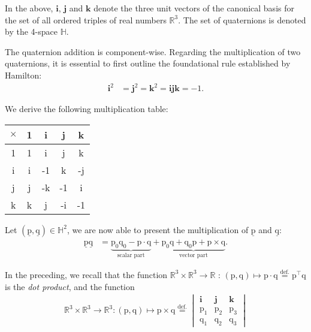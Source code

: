 \noindent In the above, $\bm{i}$, $\bm{j}$ and $\bm{k}$ denote the three unit vectors of the canonical basis for 
the set of all ordered triples of real numbers $\mathbb{R}^3$. The set of quaternions is denoted by the 4-space $\mathbb{H}$.

\bigbreak 
The quaternion addition is component-wise. Regarding the multiplication of two quaternions, it is essential to first outline the foundational rule established by \mbox{Hamilton}:
\begin{align*}
	\bm{i}^2 &= \bm{j}^2 = \bm{k}^2 = \bm{ijk}= -1.
\end{align*}

\noindent We derive the following multiplication table:

\begin{center}
	\begin{tabular}{|c||c|c|c|c|}
		\hline
		\rowcolor{gray!25}
		\cellcolor{gray!60}$\times$ & 1 & i & j & k \\
		\hline\hline
		\cellcolor{gray!25}1 & 1 & i & j & k \\
		\hline
		\cellcolor{gray!25}i & i & -1 & k & -j \\
		\hline
		\cellcolor{gray!25}j & j & -k & -1 & i \\
		\hline
		\cellcolor{gray!25}k & k & j & -i & -1 \\
		\hline
	\end{tabular}
\end{center}

\bigbreak 

\noindent Let $(\underline{\bm{\mathrm{p}}}, \underline{\bm{\mathrm{q}}})\in\mathbb{H}^2$, we are now able to present the multiplication of $\underline{\bm{\mathrm{p}}}$ and $\underline{\bm{\mathrm{q}}}$:
\begin{align*}
    \underline{\bm{\mathrm{p}}}\underline{\bm{\mathrm{q}}} &= \underbrace{\mathrm{p}_0\mathrm{q}_0 - \bm{\mathrm{p}} \cdot \bm{\mathrm{q}}}_{\text{scalar part}} + \underbrace{\mathrm{p}_0\bm{\mathrm{q}} + \mathrm{q}_0\bm{\mathrm{p}} + \bm{\mathrm{p}} \times \bm{\mathrm{q}}}_{\text{vector part}}.
\end{align*}

\noindent In the preceding, we recall that the function $\mathbb{R}^3\times\mathbb{R}^3\rightarrow\mathbb{R}$ : $(\bm{\mathrm{p}},\bm{\mathrm{q}})\mapsto\bm{\mathrm{p}}\cdot\bm{\mathrm{q}}\stackrel{\text{def.}}{=}\bm{\mathrm{p}}^\intercal\bm{\mathrm{q}}$ is the \textit{dot product}, and the function 
\begin{align*}
	\mathbb{R}^3\times\mathbb{R}^3\rightarrow\mathbb{R}^3 : (\bm{\mathrm{p}},\bm{\mathrm{q}})\mapsto\bm{\mathrm{p}}\times\bm{\mathrm{q}}\stackrel{\text{def.}}{=}\begin{vmatrix} \bm{i} & \bm{j} & \bm{k} \\ \mathrm{p}_1 & \mathrm{p}_2 & \mathrm{p}_3 \\
		\mathrm{q}_1 & \mathrm{q}_2 & \mathrm{q}_3 \end{vmatrix}
\end{align*}

